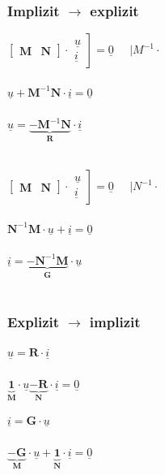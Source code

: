 \documentclass[a4paper,twocolumn,10pt]{article}
\begin{document}
\subsubsection*{Implizit $\rightarrow$ explizit}
\begin{minipage}[b]{0.23\textwidth}
$\begin{bmatrix}\textbf{M} & \textbf{N}\end{bmatrix}\cdot \left.\begin{matrix}\underline{u}\\\underline{i}\end{matrix}\right]=\underline{0}\;\;\;\;\;|M^{-1}\cdot$\\\\
$\underline{u}+\textbf{M}^{-1}\textbf{N}\cdot \underline{i}=\underline{0}$\\\\
$\underline{u}=\underbrace{-\textbf{M}^{-1}\textbf{N}}_{\textbf{R}}\cdot \underline{i}$\\\\
\end{minipage}
\hfill
\begin{minipage}[b]{0.23\textwidth}
$\begin{bmatrix}\textbf{M} & \textbf{N}\end{bmatrix}\cdot \left.\begin{matrix}\underline{u}\\\underline{i}\end{matrix}\right]=\underline{0}\;\;\;\;\;|N^{-1}\cdot$\\\\
$\textbf{N}^{-1}\textbf{M}\cdot\underline{u}+ \underline{i}=\underline{0}$\\\\
$\underline{i}=\underbrace{-\textbf{N}^{-1}\textbf{M}}_{\textbf{G}}\cdot \underline{u}$\\\\
\end{minipage}

\subsubsection*{Explizit $\rightarrow$ implizit}
\begin{minipage}[b]{0.23\textwidth}
$\underline{u}=\textbf{R}\cdot \underline{i}$\\\\
$\underbrace{\textbf{1}}_{\textbf{M}}\cdot \underline{u}\underbrace{-\textbf{R}}_{\textbf{N}}\cdot \underline{i}=\underline{0}$
\end{minipage}
\hfill
\begin{minipage}[b]{0.23\textwidth}
$\underline{i}=\textbf{G}\cdot \underline{u}$\\\\
$\underbrace{-\textbf{G}}_{\textbf{M}}\cdot \underline{u}+\underbrace{\textbf{1}}_{\textbf{N}}\cdot \underline{i}=\underline{0}$
\end{minipage}
\end{document}
